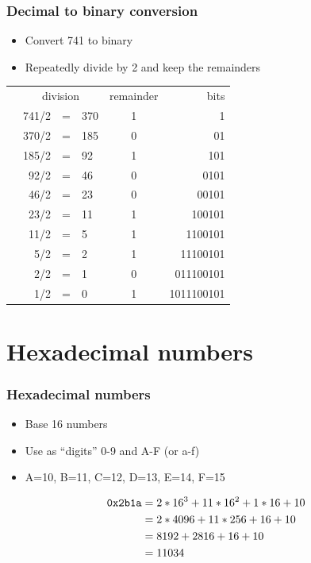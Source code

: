 \documentclass{beamer}
\begin{document}
\begin{frame}
    \frametitle{Decimal to binary conversion}
            \begin{itemize}
                \item Convert 741 to binary
                \item Repeatedly divide by 2 and keep the remainders
            \end{itemize}

            \begin{tabular}{lrclcr}
            \quad\qquad & \multicolumn{3}{c}{division} & remainder & bits \\ \cline{2-6} 
            &741/2 &=& 370 & 1 & 1 \\
            &370/2 &=& 185 & 0 & 01 \\
            &185/2 &=& 92  & 1 & 101 \\
            &92/2  &=& 46  & 0 & 0101 \\
            &46/2  &=& 23  & 0 & 00101 \\
            &23/2  &=& 11  & 1 & 100101 \\
            &11/2  &=& 5   & 1 & 1100101 \\
            &5/2   &=& 2   & 1 & 11100101 \\
            &2/2   &=& 1   & 0 & 011100101 \\
            &1/2   &=& 0   & 1 & 1011100101 
            \end{tabular}
\end{frame}

\section{Hexadecimal numbers}
\begin{frame}
    \frametitle{Hexadecimal numbers}
    \begin{itemize}
        \item Base 16 numbers
        \item Use as ``digits'' 0-9 and A-F (or a-f)
        \item A=10, B=11, C=12, D=13, E=14, F=15
    \end{itemize}
\begin{align*}
{\tt 0x2b1a} &= 2*16^3 + 11*16^2 + 1*16 + 10 \\
             &= 2*4096 + 11*256 + 16 + 10 \\
             &= 8192 + 2816 + 16 + 10 \\
             &= 11034
\end{align*}
\end{frame}
\end{document}
